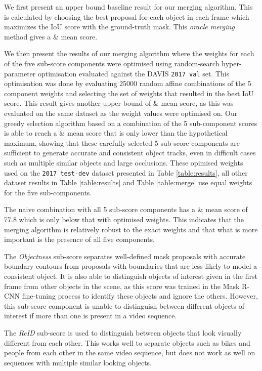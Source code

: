 \documentclass[runningheads]{llncs}
\begin{document}
We first present an upper bound baseline result for our merging algorithm. This is calculated by choosing the best proposal for each object in each frame which maximizes the IoU score with the ground-truth mask. This \textit{oracle merging} method gives a  \& mean score.

We then present the results of our merging algorithm where the weights for each of the five sub-score components were optimised using random-search hyper-parameter optimisation evaluated against the DAVIS \texttt{2017 val} set. This optimisation was done by evaluating 25000 random affine combinations of the 5 component weights and selecting the set of weights that resulted in the best IoU score. This result gives another upper bound of  \& mean score, as this was evaluated on the same dataset as the weight values were optimised on. Our greedy selection algorithm based on a combination of the 5 sub-component scores is able to reach a \& mean score that is only  lower than the hypothetical maximum, showing that these carefully selected 5 sub-score components are sufficient to generate accurate and consistent object tracks, even in difficult cases such as multiple similar objects and large occlusions. These opimised weights used on the \texttt{2017 test-dev} dataset presented in Table \ref{table:results}, all other dataset results in Table \ref{table:results} and Table \ref{table:merge} use equal weights for the five sub-components.

The naive combination with all 5 sub-score components has a \& mean score of 77.8 which is only  below that with optimised weights. This indicates that the merging algorithm is relatively robust to the exact weights and that what is more important is the presence of all five components.

The \textit{Objectness} sub-score separates well-defined mask proposals with accurate boundary contours from proposals with boundaries that are less likely to model a consistent object. It is also able to distinguish objects of interest given in the first frame from other objects in the scene, as this score was trained in the Mask R-CNN fine-tuning process to identify these objects and ignore the others. However, this sub-score component is unable to distinguish between different objects of interest if more than one is present in a video sequence.

The \textit{ReID} sub-score is used to distinguish between objects that look visually different from each other. This works well to separate objects such as bikes and people from each other in the same video sequence, but does not work as well on sequences with multiple similar looking objects.
\end{document}
